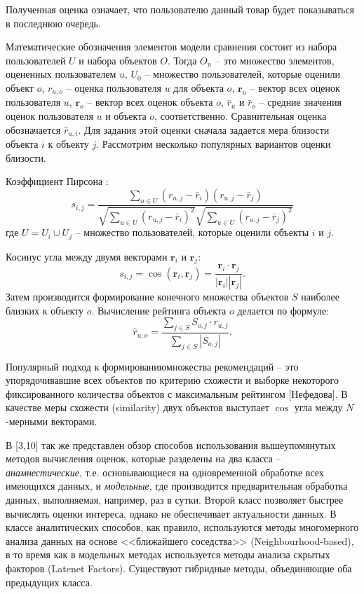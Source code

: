 \documentclass[a4paper,14pt,openany,final]{extreport} %
\begin{document}
	Полученная оценка означает, что пользователю данный товар будет показываться в последнюю очередь.


Математические обозначения элементов модели сравнения состоит из набора пользователей $U$  и набора объектов $O$. Тогда $O_u$ -- это множество элементов, оцененных пользователем $u$, $U_0$ -- множество пользователей, которые оценили объект $o$, $r_{u,o}$ -- оценка пользователя $u$ для объекта $o$, $\mathbf{r}_u$ -- вектор всех оценок пользователя $u$, $\mathbf{r}_o$  -- вектор всех оценок объекта $o$, $\bar{r}_u$ и $\bar{r}_o$ -- средние значения оценок пользователя $u$ и объекта $o$,   соответственно. Сравнительная оценка обозначается $\hat{r}_{u,i}$. Для задания этой оценки сначала задается мера близости объекта $i$ к объекту $j$. Рассмотрим несколько популярных вариантов оценки близости.

Коэффициент Пирсона \cite{b3}:
\[
  s_{i,j}=\frac{\sum\limits_{u\in U}(r_{u,j}-\bar{r}_i)(r_{u,j}-\bar{r}_j)}{\sqrt{\sum\limits_{u\in U}(r_{u,j}-\bar{r}_i)^2}\sqrt{\sum\limits_{u\in U}(r_{u,j}-\bar{r}_j)^2}}
\]
где $U=U_i\cup U_j$ -- множество пользователей, которые оценили объекты $i$ и $j$.

Косинус угла между двумя векторами $\mathbf{r}_i$ и $\mathbf{r}_j$:
\[
  s_{i,j}=\cos(\mathbf{r}_i,\mathbf{r}_j)=\frac{\mathbf{r}_i \cdot \mathbf{r}_j}{|\mathbf{r}_i||\mathbf{r}_j|}.
\]
Затем производится формирование конечного множества объектов $S$ наиболее близких к объекту $o$. Вычисление рейтинга объекта $o$ делается по формуле:
\[
  \hat{r}_{u,o}=\frac{\sum\limits_{j\in S}S_{o,j}\cdot r_{u,j}}{\sum\limits_{j\in S}|S_{o,j}|}.
\]

Популярный подход к формированиюмножества рекомендаций -- это упорядочивавшие всех объектов по критерию схожести и выборке некоторого фиксированного количества объектов с максимальным рейтингом [Нефедова]. В качестве меры схожести (\foreignlanguage{english}{similarity}) двух объектов выступает $\cos$ угла между $N$-мерными векторами.

В [3,10] так же представлен обзор способов использования вышеупомянутых методов вычисления оценок, которые разделены на два класса -- \emph{анамнестические}, т.е. основывающиеся на одновременной обработке всех имеющихся данных, и \emph{модельные}, где производится предварительная обработка данных, выполняемая, например, раз в сутки. Второй класс позволяет быстрее вычислять оценки интереса, однако не обеспечивает актуальности данных. В классе аналитических способов, как правило, используются методы многомерного анализа данных на основе <<ближайшего соседства>> (\foreignlanguage{english}{Neighbourhood-based}), в то время как в модельных методах используется методы анализа скрытых факторов (\foreignlanguage{english}{Latenet Factors}). Существуют гибридные методы, объединяющие оба предыдущих класса.
\end{document}
